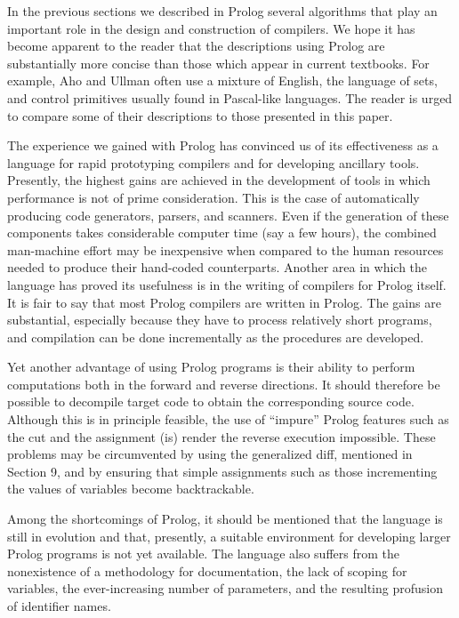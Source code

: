 \label{cohen10}

In the previous sections we described in Prolog several algorithms that play an
important role in the design and construction of compilers. We hope it has
become apparent to the reader that the descriptions using Prolog are substantially
more concise than those which appear in current textbooks. For example, Aho
and Ullman often use a mixture of English, the language of sets, and control
primitives usually found in Pascal-like languages. The reader is urged to compare
some of their descriptions to those presented in this paper. 

The experience we gained with Prolog has convinced us of its effectiveness as
a language for rapid prototyping compilers and for developing ancillary tools.
Presently, the highest gains are achieved in the development of tools in which
performance is not of prime consideration. This is the case of automatically
producing code generators, parsers, and scanners. Even if the generation of these
components takes considerable computer time (say a few hours), the combined
man-machine effort may be inexpensive when compared to the human resources
needed to produce their hand-coded counterparts. Another area in which the
language has proved its usefulness is in the writing of compilers for Prolog itself.
It is fair to say that most Prolog compilers are written in Prolog. The gains are
substantial, especially because they have to process relatively short programs,
and compilation can be done incrementally as the procedures are developed. 

Yet another advantage of using Prolog programs is their ability to perform
computations both in the forward and reverse directions. It should therefore be
possible to decompile target code to obtain the corresponding source code.
Although this is in principle feasible, the use of “impure” Prolog features
such as the cut and the assignment (is) render the reverse execution impossible.
These problems may be circumvented by using the generalized diff, mentioned in
Section 9, and by ensuring that simple assignments such as those incrementing
the values of variables become backtrackable. 

Among the shortcomings of Prolog, it should be mentioned that the language
is still in evolution and that, presently, a suitable environment for developing
larger Prolog programs is not yet available. The language also suffers from the
nonexistence of a methodology for documentation, the lack of scoping for variables,
the ever-increasing number of parameters, and the resulting profusion of
identifier names. 


